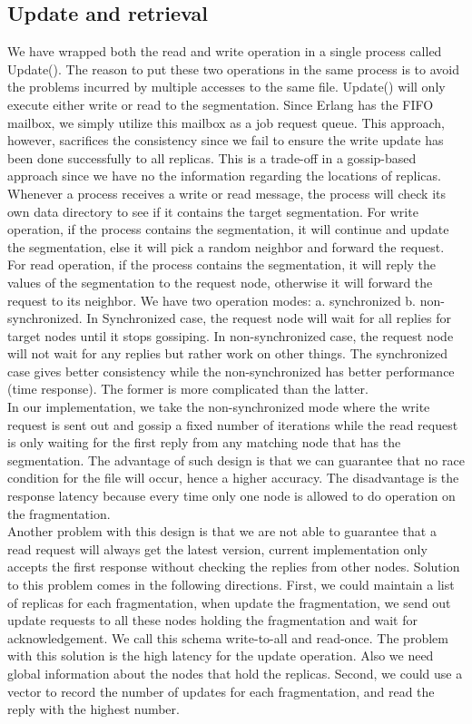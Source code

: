 \documentclass[12pt, conference, compsocconf]{IEEEtran}
\begin{document}
 \subsection{Update and retrieval}
\indent We have wrapped both the read and write operation in a single process called Update(). The reason to put these two operations in the same process is to avoid the problems incurred by multiple accesses to the same file. Update() will only execute either write or read to the segmentation. Since Erlang has the FIFO mailbox, we simply utilize this mailbox as a job request queue. This approach, however, sacrifices the consistency since we fail to ensure the write update has been done successfully to all replicas. This is a trade-off in a gossip-based approach since we have no the information regarding the locations of replicas. \\
\indent Whenever a process receives a write or read message, the process will check its own data directory to see if it contains the target segmentation. For write operation, if the process contains the segmentation, it will continue and update the segmentation, else it will pick a random neighbor and forward the request. For read operation, if the process contains the segmentation, it will reply the values of the segmentation to the request node, otherwise it will forward the request to its neighbor. We have two operation modes: a. synchronized b. non-synchronized. In Synchronized case, the request node will wait for all replies for target nodes until it stops gossiping. In non-synchronized case, the request node will not wait for any replies but rather work on other things. The synchronized case gives better consistency while the non-synchronized has better performance (time response). The former is more complicated than the latter. \\
\indent In our implementation, we take the non-synchronized mode where the write request is sent out and gossip a fixed number of iterations while the read request is only waiting for the first reply from any matching node that has the segmentation.
The advantage of such design is that we can guarantee that no race condition for the file will occur, hence a higher accuracy. The disadvantage is the response latency because every time only one node is allowed to do operation on the fragmentation. \\
\indent Another problem with this design is that we are not able to guarantee that a read request will always get the latest version, current implementation only accepts the first response without checking the replies from other nodes. Solution to this problem comes in the following directions. First, we could maintain a list of replicas for each fragmentation, when update the fragmentation, we send out update requests to all these nodes holding the fragmentation and wait for acknowledgement. We call this schema write-to-all and read-once. The problem with this solution is the high latency for the update operation. Also we need global information about the nodes that hold the replicas. Second, we could use a vector to record the number of updates for each fragmentation, and read the reply with the highest number.  
\end{document}
